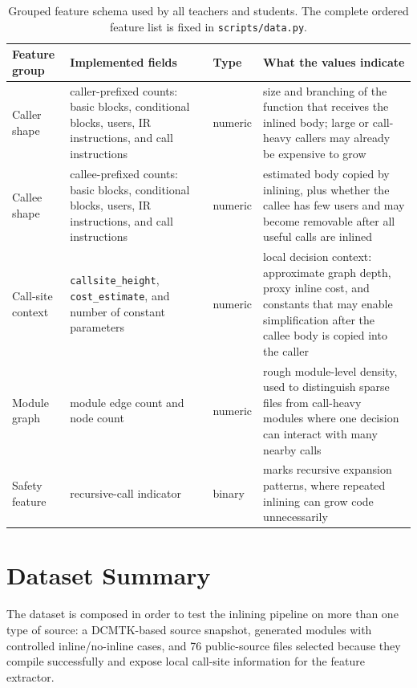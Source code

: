 \documentclass[12pt, a4paper]{report}
\begin{document}
\begin{table}[H]
\centering
{\small
\renewcommand{\arraystretch}{1.08}
\setlength{\tabcolsep}{3pt}
\begin{tabular}{|>{\raggedright\arraybackslash}p{}|
                >{\raggedright\arraybackslash}p{}|
                >{\raggedright\arraybackslash}p{}|
                >{\raggedright\arraybackslash}p{}|}
\hline
Feature group & Implemented fields & Type & What the values indicate \\
\hline
Caller shape & caller-prefixed counts: basic blocks, conditional blocks,
users, IR instructions, and call instructions & numeric & size and branching
of the function that receives the inlined body; large or call-heavy callers may
already be expensive to grow \\
\hline
Callee shape & callee-prefixed counts: basic blocks, conditional blocks,
users, IR instructions, and call instructions & numeric & estimated body copied
by inlining, plus whether the callee has few users and may become removable
after all useful calls are inlined \\
\hline
Call-site context & \texttt{callsite\_height}, \texttt{cost\_estimate}, and
number of constant parameters & numeric & local decision context:
approximate graph depth, proxy inline cost, and constants that may enable
simplification after the callee body is copied into the caller \\
\hline
Module graph & module edge count and node count & numeric & rough module-level
density, used to distinguish sparse files from call-heavy modules where one
decision can interact with many nearby calls \\
\hline
Safety feature & recursive-call indicator & binary & marks recursive expansion
patterns, where repeated inlining can grow code unnecessarily \\
\hline
\end{tabular}
}
\caption{Grouped feature schema used by all teachers and students. The complete
ordered feature list is fixed in \texttt{scripts/data.py}.}
\label{tab:feature-schema}
\end{table}

\section{Dataset Summary}

The dataset is composed in order to test the inlining pipeline on more than one
type of source: a DCMTK-based source snapshot, generated modules with controlled
inline/no-inline cases, and 76 public-source files selected because they compile
successfully and expose local call-site information for the feature extractor.
\end{document}
